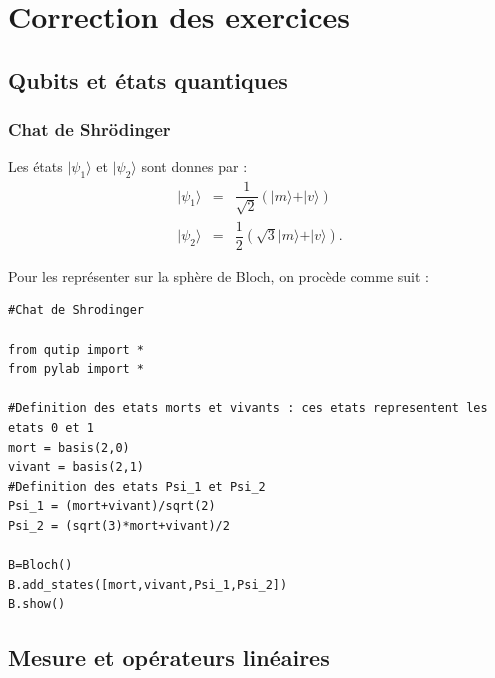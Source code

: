 \documentclass[a4paper,12pt]{book}
\numberwithin{equation}{section}
\newcommand{\ket}[1]{\vert#1\rangle}
\begin{document}
\chapter{Correction des exercices}
\label{chap:correct}

\bigskip

\section{Qubits et  états quantiques}
\subsection{Chat de Shr\"odinger}
Les états $\ket{\psi_1}$ et $\ket{\psi_2}$ sont donnes par :
\begin{equation}
\begin{array}{rcl}
\ket{\psi_1} &=& \dfrac{1}{\sqrt{2}}(\ket{m}+\ket{v})\\
\ket{\psi_2} &=& \dfrac{1}{2}(\sqrt{3}\ket{m}+\ket{v}).
\end{array}
\end{equation}

Pour les représenter sur la sphère de Bloch, on procède comme suit :
\begin{lstlisting}
#Chat de Shrodinger

from qutip import *
from pylab import *

#Definition des etats morts et vivants : ces etats representent les etats 0 et 1
mort = basis(2,0)
vivant = basis(2,1)
#Definition des etats Psi_1 et Psi_2
Psi_1 = (mort+vivant)/sqrt(2)
Psi_2 = (sqrt(3)*mort+vivant)/2

B=Bloch()
B.add_states([mort,vivant,Psi_1,Psi_2])
B.show()

\end{lstlisting}
\section{Mesure et opérateurs linéaires}
\end{document}
